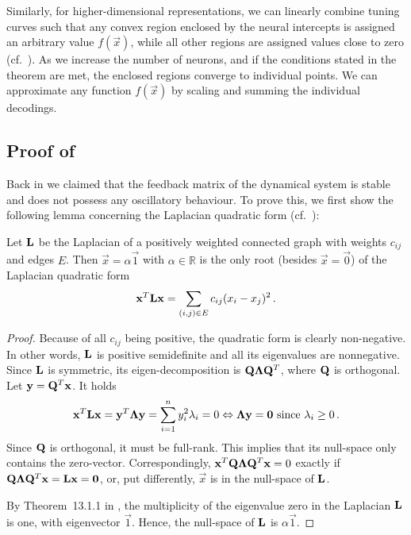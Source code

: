Similarly, for higher-dimensional representations, we can linearly combine tuning curves such that any convex region enclosed by the neural intercepts is assigned an arbitrary value $f(\vec x)$, while all other regions are assigned values close to zero (cf.~).
As we increase the number of neurons, and if the conditions stated in the theorem are met, the enclosed regions converge to individual points.
We can approximate any function $f(\vec x)$ by scaling and summing the individual decodings.

\subsection{Proof of }
\label{app:thm_nlif_convergence}

Back in  we claimed that the feedback matrix of the \nlif dynamical system is stable and does not possess any oscillatory behaviour.
To prove this, we first show the following lemma concerning the Laplacian quadratic form (cf.~\cite[Section~18.3.2]{spielman2012spectral}):
\begin{lemma}
\label{lem:laplacian_quadratic}
Let $\mathbf{L}$ be the Laplacian of a positively weighted connected graph with weights $c_{ij}$ and edges $E$.
Then $\vec x = \alpha \vec{1}$ with $\alpha \in \mathbb{R}$ is the only root (besides $\vec x = \vec{0}$) of the Laplacian quadratic form
\begin{align*}
	\mathbf{x}^T \mathbf{L} \mathbf{x} = \sum_{(i, j) \in E} c_{ij} (x_i - x_j)^2 \,.
\end{align*}
\end{lemma}
\begin{proof}
Because of all $c_{ij}$ being positive, the quadratic form is clearly non-negative. In other words, $\mathbf{L}$ is positive semidefinite and all its eigenvalues are nonnegative.
Since $\mathbf{L}$ is symmetric, its eigen-decomposition is $\mathbf{Q} \mathbf{\Lambda} \mathbf{Q}^T$, where $\mathbf{Q}$ is orthogonal.
Let $\mathbf{y} = \mathbf{Q}^T \mathbf{x}$.
It holds
\begin{align*}
	\mathbf{x}^T \mathbf{L} \mathbf{x} = \mathbf{y}^T \mathbf{\Lambda} \mathbf{y} = \sum_{i = 1}^n y_i^2 \lambda_i = 0 \Leftrightarrow \mathbf{\Lambda} \mathbf{y} = \mathbf{0} \text{ since } \lambda_i \geq 0\,.
\end{align*}
Since $\mathbf{Q}$ is orthogonal, it must be full-rank.
This implies that its null-space only contains the zero-vector.
Correspondingly, $\mathbf{x}^T \mathbf{Q} \mathbf{\Lambda} \mathbf{Q}^T \mathbf{x} = 0$ exactly if $\mathbf{Q} \mathbf{\Lambda} \mathbf{Q}^T \mathbf{x} = \mathbf{L} \mathbf{x} = \mathbf{0}$, or, put differently, $\vec x$ is in the null-space of $\mathbf{L}$.

By Theorem~13.1.1 in \citet[Chapter~13]{godsil2001algebraic}, the multiplicity of the eigenvalue zero in the Laplacian $\mathbf{L}$ is one, with eigenvector $\vec 1$.
Hence, the null-space of $\mathbf{L}$ is $\alpha \vec 1$.
\end{proof}

